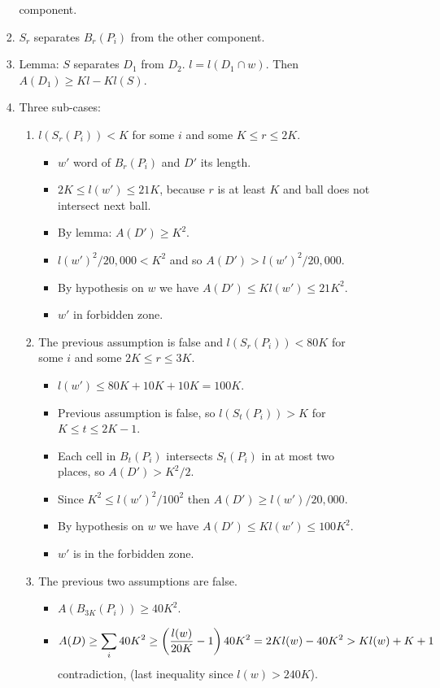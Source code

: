 \documentclass[11pt]{article} \usepackage{amssymb}
\begin{document}
\begin{enumerate}
\begin{enumerate}
\begin{enumerate}
        component.
      \item $S_r$ separates $B_r(P_i)$ from the other component.
      \item Lemma: $S$ separates $D_1$ from $D_2$. $l=l(D_1\cap w)$. Then
        $A(D_1)\geq Kl-Kl(S)$.
      \item Three sub-cases:
        \begin{enumerate}
        \item $l(S_r(P_i))<K$ for some $i$ and some $K \leq r \leq 2K$. 
          \begin{itemize}
          \item $w'$ word of $B_r(P_i)$ and $D'$ its length.
          \item $2K\leq l(w') \leq 21K$, because $r$ is at least $K$ and 
            ball does not
            intersect next ball. 
          \item By lemma: $A(D')\geq K^2$.
          \item $l(w')^2/20,000<K^2$ and so $A(D')>l(w')^2/20,000$.
          \item By hypothesis on $w$ we have $A(D')\leq Kl(w')\leq 21K^2$.
          \item $w'$ in forbidden zone.
          \end{itemize}
        \item  The previous assumption is false and 
          $l(S_r(P_i))<80K$ for some $i$ and some $2K \leq r \leq 3K$. 
          \begin{itemize}
          \item $l(w')\leq 80K+10K+10K=100K$.
          \item Previous assumption is false, so $l(S_t(P_i))>K$ for 
            $K \leq t \leq 2K -1$.
          \item Each cell in $B_t(P_i)$ intersects $S_t(P_i)$ in at most
            two places, so $A(D')>K^2/2$.
          \item Since $K^2\leq l(w')^2/100^2$ then $A(D') \geq l(w')/20,000$.
          \item By hypothesis on $w$ we have $A(D') \leq Kl(w') \leq 100K^2$.
          \item $w'$ is in the forbidden zone.
          \end{itemize}
        \item The previous two assumptions are false.
          \begin{itemize}
          \item $A(B_{3K}(P_i)) \geq 40K^2$.
          \item 
            $$A(D)\geq \sum_i 40K^2\geq \left({l(w)\over 20K}-1\right)40K^2=2Kl(w)-40K^2>Kl(w)+K+1$$
            contradiction, (last inequality since $l(w)>240K$).
          \end{itemize}
        \end{enumerate}
      \end{enumerate}
    \end{enumerate}
\end{enumerate}
\end{document}
